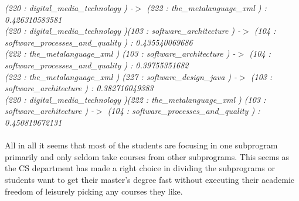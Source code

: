 \textit{
(220 : digital\_media\_technology ) -$>$ (222 : the\_metalanguage\_xml ) : \\ 0.426310583581\\
(220 : digital\_media\_technology )(103 : software\_architecture ) -$>$ (104 : software\_processes\_and\_quality ) :  0.435540069686\\
(222 : the\_metalanguage\_xml ) (103 : software\_architecture ) -$>$ (104 : software\_processes\_and\_quality ) :  0.39755351682\\
(222 : the\_metalanguage\_xml ) (227 : software\_design\_java ) -$>$ (103 : software\_architecture ) :  0.382716049383\\
(220 : digital\_media\_technology )(222 : the\_metalanguage\_xml ) (103 : software\_architecture ) -$>$ (104 : software\_processes\_and\_quality ) :  0.450819672131\\
}\\

All in all it seems that most of the students are focusing in one subprogram primarily and only seldom take courses
from other subprograms. This seems as the CS department has made a right choice in dividing the subprograms or
students want to get their master's degree fast without executing their academic freedom of leisurely picking
any courses they like.
